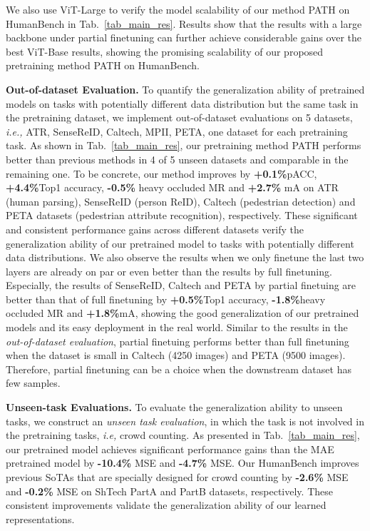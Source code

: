 \documentclass[10pt,twocolumn,letterpaper]{article}
\begin{document}
We also use ViT-Large to verify the model scalability of our method PATH on HumanBench in Tab.~\ref{tab_main_res}. Results show that the results with a large backbone under partial finetuning can further achieve considerable gains over the best ViT-Base results, showing the promising scalability of our proposed pretraining method PATH on HumanBench.















\noindent \textbf{Out-of-dataset Evaluation.}
To quantify the generalization ability of  pretrained models on tasks with potentially different data distribution but the same task in the pretraining dataset, we implement out-of-dataset evaluations on 5 datasets, \emph{i.e.,} ATR, SenseReID, Caltech, MPII, PETA, one dataset for each pretraining task. As shown in Tab.~\ref{tab_main_res}, our pretraining method PATH performs better than previous methods in 4 of 5 unseen datasets and comparable in the remaining one. To be concrete, our method improves by \textbf{+0.1\%}pACC, \textbf{+4.4\%}Top1 accuracy, \textbf{-0.5\%} heavy occluded MR and \textbf{+2.7\%} mA on ATR (human parsing), SenseReID (person ReID), Caltech (pedestrian detection) and PETA datasets (pedestrian attribute recognition), respectively.
These significant and consistent performance gains across different datasets verify the generalization ability of our pretrained model to tasks with potentially different data distributions. We also observe the results when we only finetune the last two layers are already on par or even better than the results by full finetuning. Especially, the results of SenseReID, Caltech and PETA by partial finetuing are better than that of full finetuning by \textbf{+0.5\%}Top1 accuracy, \textbf{-1.8\%}heavy occluded MR and \textbf{+1.8\%}mA, showing the good generalization of our pretrained models and its easy deployment in the real world. Similar to the results in the \emph{out-of-dataset evaluation}, partial finetuing performs better than full finetuning when the dataset is small in Caltech (4250 images) and PETA (9500 images). Therefore, partial finetuning can be a choice when the downstream dataset has few samples.





\noindent \textbf{Unseen-task Evaluations.} \label{sec:unseen}
To evaluate the generalization ability to unseen tasks, we construct an \emph{unseen task evaluation}, in which the task is not involved in the pretraining tasks, \emph{i.e,} crowd counting. As presented in Tab.~\ref{tab_main_res}, our pretrained model achieves significant performance gains than the MAE pretrained model by \textbf{-10.4\%} MSE and \textbf{-4.7\%} MSE. Our HumanBench improves previous SoTAs that are specially designed for crowd counting by \textbf{-2.6\%} MSE and \textbf{-0.2\%} MSE on ShTech PartA and PartB datasets, respectively. These consistent improvements validate the generalization ability of our learned representations.
\end{document}
